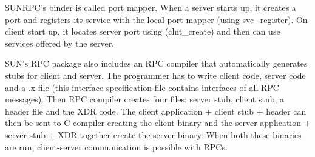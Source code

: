 \documentclass[twoside]{article}
\begin{document}
SUNRPC's binder is called port mapper. When a server starts up, it creates a port and registers its service with the local port mapper (using svc\_register). On client start up, it locates server port using (clnt\_create) and then can use services offered by the server.



SUN's RPC package also includes an RPC compiler that automatically generates stubs for client and server. The programmer has to write client code, server code and a .x file (this interface specification file contains interfaces of all RPC messages). Then RPC compiler creates four files: server stub, client stub, a header file and the XDR code. The client application + client stub + header can then be sent to C compiler creating the client binary and the server application + server stub + XDR together create the server binary. When both these binaries are run, client-server communication is possible with RPCs.
\end{document}
